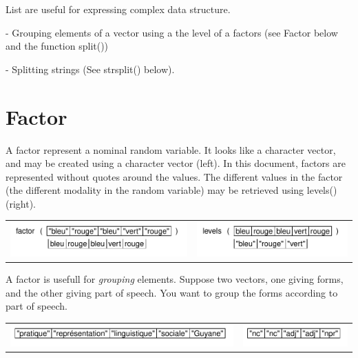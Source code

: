 \documentclass[pdflatex]{article}
\begin{document}
List are useful for expressing complex data structure.

- Grouping elements of a vector using a the level of a factors (see Factor below and the function split())

- Splitting strings (See strsplit() below).


\section{Factor}

A factor represent a nominal random variable. It looks like a character
vector, and may be created using a character vector (left). In this document,
factors are represented without quotes around the values. The different values in
the factor (the different modality in the random variable) may be retrieved
using levels() (right).

\begin{tabular}{cc}
\includegraphics{factor} & \includegraphics{levels}\\
\end{tabular}

A factor is usefull for \emph{grouping} elements. Suppose two vectors, one
giving forms, and the other giving part of speech. You want to group the forms
according to part of speech. 

\begin{tabular}{cc}
\includegraphics{forms1} & \includegraphics{pos1}\\
\end{tabular}
\end{document}
